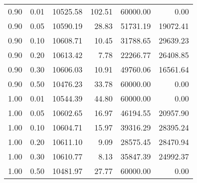 \begin{table}
\begin{tabular}{rrrrrr}
0.90 & 0.01 & 10525.58 & 102.51 & 60000.00 & 0.00 \\
0.90 & 0.05 & 10590.19 & 28.83 & 51731.19 & 19072.41 \\
0.90 & 0.10 & 10608.71 & 10.45 & 31788.65 & 29639.23 \\
0.90 & 0.20 & 10613.42 & 7.78 & 22266.77 & 26408.85 \\
0.90 & 0.30 & 10606.03 & 10.91 & 49760.06 & 16561.64 \\
0.90 & 0.50 & 10476.23 & 33.78 & 60000.00 & 0.00 \\
1.00 & 0.01 & 10544.39 & 44.80 & 60000.00 & 0.00 \\
1.00 & 0.05 & 10602.65 & 16.97 & 46194.55 & 20957.90 \\
1.00 & 0.10 & 10604.71 & 15.97 & 39316.29 & 28395.24 \\
1.00 & 0.20 & 10611.10 & 9.09 & 28575.45 & 28470.94 \\
1.00 & 0.30 & 10610.77 & 8.13 & 35847.39 & 24992.37 \\
1.00 & 0.50 & 10481.97 & 27.77 & 60000.00 & 0.00 \\
\bottomrule
\end{tabular}
\end{table}
